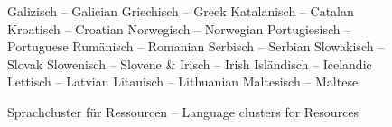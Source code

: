 \documentclass[]{../../metanetpaper}
\begin{document}
\begin{Parallel}[c]{79mm}{78mm}
\begin{figure}
\begin{tabular}
    Galizisch -- \textcolor{grey3}{Galician} \newline 
    Griechisch -- \textcolor{grey3}{Greek} \newline 
    Katalanisch -- \textcolor{grey3}{Catalan} \newline 
    Kroatisch -- \textcolor{grey3}{Croatian} \newline 
    Norwegisch -- \textcolor{grey3}{Norwegian} \newline 
    Portugiesisch -- \textcolor{grey3}{Portuguese} \newline 
    Rumänisch -- \textcolor{grey3}{Romanian} \newline 
    Serbisch -- \textcolor{grey3}{Serbian} \newline 
    Slowakisch -- \textcolor{grey3}{Slovak} \newline 
    Slowenisch -- \textcolor{grey3}{Slovene}
    & 
    Irisch -- \textcolor{grey3}{Irish} \newline 
    Isländisch -- \textcolor{grey3}{Icelandic} \newline 
    Lettisch -- \textcolor{grey3}{Latvian} \newline 
    Litauisch -- \textcolor{grey3}{Lithuanian} \newline 
    Maltesisch -- \textcolor{grey3}{Maltese} 
    \\
  \end{tabular}
  \label{fig:resources_cluster}
  \caption{Sprachcluster für Ressourcen -- \textcolor{grey3}{Language clusters for Resources}}
\end{figure}

\end{Parallel}
\end{document}
